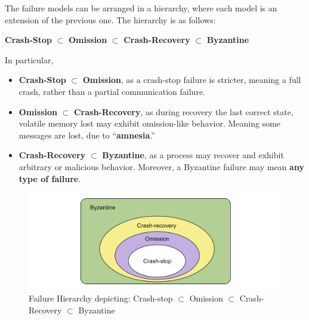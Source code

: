 \begin{theo}

    The failure models can be arranged in a hierarchy, where each model is an extension of the previous one. 
    The hierarchy is as follows:
    \begin{center}
        \textbf{Crash-Stop} $\subset$ \textbf{Omission} $\subset$ \textbf{Crash-Recovery} $\subset$ \textbf{Byzantine}
    \end{center}
    In particular, 
    \begin{itemize}
        \item \textbf{Crash-Stop} $\subset$ \textbf{Omission}, as a crash-stop failure is stricter, meaning a full crash, rather than a partial communication failure.
        \item \textbf{Omission} $\subset$ \textbf{Crash-Recovery}, as during recovery the last correct state, volatile memory lost may exhibit omission-like behavior. Meaning some messages are lost, due to ``\textbf{amnesia}.''
        \item \textbf{Crash-Recovery} $\subset$ \textbf{Byzantine}, as a process may recover and exhibit arbitrary or malicious behavior. Moreover, a Byzantine failure may mean \textbf{any type of failure}.
    \end{itemize}
\end{theo}

\begin{figure}[h]
    \centering
    \includegraphics[width=\textwidth]{Sections/crash/fail.png}
    \caption{Failure Hierarchy depicting: Crash-stop $\subset$ Omission $\subset$ Crash-Recovery $\subset$ Byzantine}
\end{figure}



